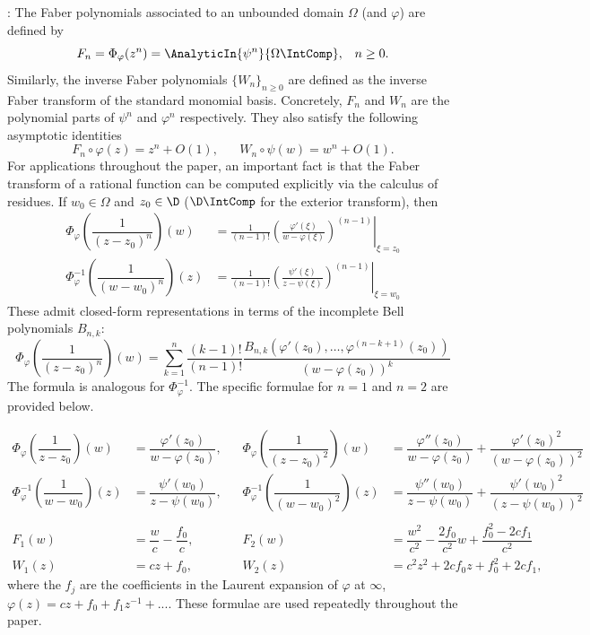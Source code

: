 \documentclass{article}
\numberwithin{equation}{section}
\begin{document}
: The Faber polynomials associated to an unbounded domain $\Omega$ (and $\varphi$) are defined by
$$F_n=\Phi_{\varphi}(z^n)=\AnalyticIn{\psi^n}{\Omega\IntComp},\;\;\;n\geq0.$$
Similarly, the inverse Faber polynomials $\{W_n\}_{n\geq0}$ are defined as the inverse Faber transform of the standard monomial basis. Concretely, $F_n$ and $W_n$ are the polynomial parts of $\psi^n$ and $\varphi^n$ respectively. They also satisfy the following asymptotic identities
$$F_n\circ\varphi(z)=z^n+O(1),\;\;\;\;\;\;W_n\circ\psi(w)=w^n+O(1).$$
For applications throughout the paper, an important fact is that the Faber transform of a rational function can be computed explicitly via the calculus of residues. If $w_0\in\Omega$ and $z_0\in\D$ ($\D\IntComp$ for the exterior transform), then
\begin{equation}\label{eqn:FTFormulae}
\begin{alignedat}{1}
\Phi_{\varphi}\left(\dfrac{1}{(z-z_0)^{n}}\right)(w)&=\frac{1}{(n-1)!}\left.\left(\frac{\varphi'(\xi)}{w-\varphi(\xi)}\right)^{(n-1)}\right\vert_{\xi=z_0}\\
\Phi_{\varphi}^{-1}\left(\dfrac{1}{(w-w_0)^{n}}\right)(z)&=\frac{1}{(n-1)!}\left.\left(\frac{\psi'(\xi)}{z-\psi(\xi)}\right)^{(n-1)}\right\vert_{\xi=w_0}
\end{alignedat}
\end{equation}
These admit closed-form representations in terms of the incomplete Bell polynomials $B_{n,k}$:
\begin{equation}
    \Phi_{\varphi}\left(\dfrac{1}{(z-z_0)^{n}}\right)(w)=\sum_{k=1}^{n}\dfrac{(k-1)!}{(n-1)!}\dfrac{B_{n,k}(\varphi'(z_0),\hdots,\varphi^{(n-k+1)}(z_0))}{(w-\varphi(z_0))^{k}}
\end{equation}
The formula is analogous for $\Phi_{\varphi}^{-1}$. The specific formulae for $n=1$ and $n=2$ are provided below.

\begin{equation}\label{eqn:FaberPolyFormulae}
\begin{alignedat}{2}
\Phi_{\varphi}\left(\dfrac{1}{z-z_0}\right)(w)&=\dfrac{\varphi'(z_0)}{w-\varphi(z_0)},\;\;\;&\Phi_{\varphi}\left(\dfrac{1}{(z-z_0)^{2}}\right)(w)&=\dfrac{\varphi''(z_0)}{w-\varphi(z_0)}+\dfrac{\varphi'(z_0)^2}{(w-\varphi(z_0))^2}\\
\Phi_{\varphi}^{-1}\left(\dfrac{1}{w-w_0}\right)(z)&=\dfrac{\psi'(w_0)}{z-\psi(w_0)},\;\;\;&\Phi_{\varphi}^{-1}\left(\dfrac{1}{(w-w_0)^{2}}\right)(z)&=\dfrac{\psi''(w_0)}{z-\psi(w_0)}+\dfrac{\psi'(w_0)^2}{(z-\psi(w_0))^2}\\
& & &\\
F_1(w)&=\dfrac{w}{c}-\dfrac{f_0}{c}, &F_2(w)&=\dfrac{w^2}{c^2}-\dfrac{2f_0}{c^2}w+\dfrac{f_0^2-2cf_1}{c^2}\\
W_1(z)&=cz+f_0, &W_2(z)&=c^2z^2+2cf_0z+f_0^2+2cf_1,
\end{alignedat}
\end{equation}
where the $f_j$ are the coefficients in the Laurent expansion of $\varphi$ at $\infty$, $\varphi(z)=cz+f_0+f_1z^{-1}+...$. These formulae are used repeatedly throughout the paper.
\end{document}
